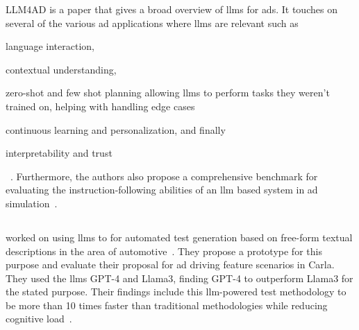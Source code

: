 LLM4AD is a paper that gives a broad overview of \acrshort{llms} for \acrlong{ads}. It touches on
several of the various \acrshort{ad} applications where \acrshort{llms} are relevant such as
\begin{inparaenum}
    \item language interaction,
    \item contextual understanding,
    \item zero-shot and few shot planning allowing \acrshort{llms} to perform tasks they weren't trained
    on, helping with handling edge cases
    \item continuous learning and personalization, and finally
    \item interpretability and trust \end{inparaenum}~\cite[2]{LLM4AD}. Furthermore, the authors
also propose a comprehensive benchmark for evaluating the instruction-following abilities of an
\acrshort{llm} based system in \acrshort{ad} simulation~\cite[1]{LLM4AD}.

\subsection{}

\citeauthor{LLMDrivenTestingADS24} worked on using \acrshort{llms} to for automated test generation
based on free-form textual descriptions in the area of automotive~\cite[173]{LLMDrivenTestingADS24}.
They propose a prototype for this purpose and evaluate their proposal for \acrshort{ad} driving
feature scenarios in Carla. They used the \acrshort{llms} GPT-4 and Llama3, finding GPT-4 to
outperform Llama3 for the stated purpose. Their findings include this \acrshort{llm}-powered test
methodology to be more than \num{10} times faster than traditional methodologies while reducing
cognitive load~\cite[173]{LLMDrivenTestingADS24}.

\subsection{}

